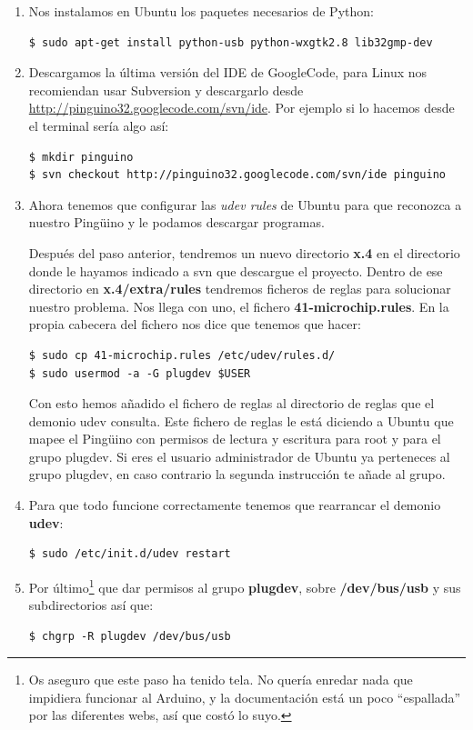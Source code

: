 \documentclass[12pt,a4paper,twoside,DIV=15]{scrartcl}
\begin{document}
\begin{enumerate}
\item Nos instalamos en Ubuntu los paquetes necesarios de Python:
\begin{verbatim}
$ sudo apt-get install python-usb python-wxgtk2.8 lib32gmp-dev
\end{verbatim}
\item Descargamos la última versión del IDE de GoogleCode, para Linux
  nos recomiendan usar Subversion y descargarlo desde
  \url{http://pinguino32.googlecode.com/svn/ide}. Por ejemplo si lo
  hacemos desde el terminal sería algo así:
\begin{verbatim}
$ mkdir pinguino
$ svn checkout http://pinguino32.googlecode.com/svn/ide pinguino
\end{verbatim}
\item Ahora tenemos que configurar las \emph{udev rules} de Ubuntu
  para que reconozca a nuestro Pingüino y le podamos descargar
  programas.

  Después del paso anterior, tendremos un nuevo directorio
  \textbf{x.4} en el directorio donde le hayamos indicado a svn que
  descargue el proyecto. Dentro de ese directorio en
  \textbf{x.4/extra/rules} tendremos ficheros de reglas para
  solucionar nuestro problema. Nos llega con uno, el fichero
  \textbf{41-microchip.rules}. En la propia cabecera del fichero nos
  dice que tenemos que hacer:
\begin{verbatim}
$ sudo cp 41-microchip.rules /etc/udev/rules.d/
$ sudo usermod -a -G plugdev $USER
\end{verbatim}
  Con esto hemos añadido el fichero de reglas al directorio de reglas
  que el demonio udev consulta. Este fichero de reglas le está diciendo
  a Ubuntu que mapee el Pingüino con permisos de lectura y escritura
  para root y para el grupo plugdev. Si eres el usuario administrador
  de Ubuntu ya perteneces al grupo plugdev, en caso contrario la
  segunda instrucción te añade al grupo.
\item Para que todo funcione correctamente tenemos que rearrancar el
  demonio \textbf{udev}:
\begin{verbatim}
$ sudo /etc/init.d/udev restart
\end{verbatim}
\item Por último\footnote{Os aseguro que este paso ha tenido tela. No
    quería enredar nada que impidiera funcionar al Arduino, y la
    documentación está un poco ``espallada'' por las diferentes webs,
    así que costó lo suyo.}  que dar permisos al grupo
  \textbf{plugdev}, sobre \textbf{/dev/bus/usb} y sus subdirectorios
  así que:
\begin{verbatim}
$ chgrp -R plugdev /dev/bus/usb
\end{verbatim}
\end{enumerate}
\end{document}
